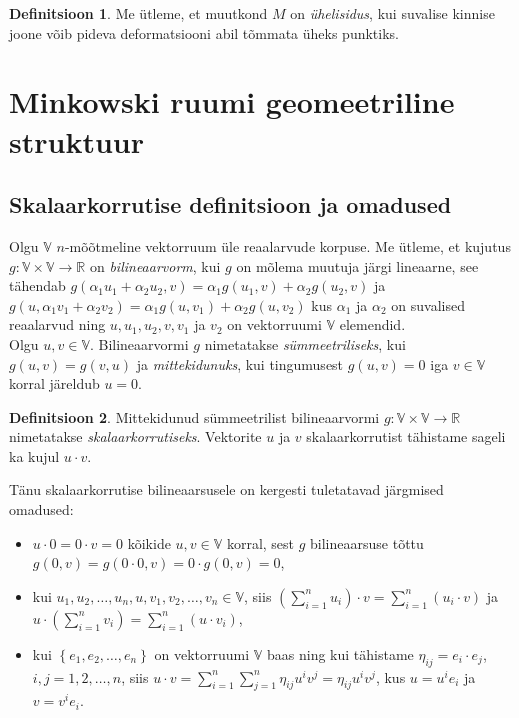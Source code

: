 \documentclass[a4paper,12pt]{article}
\theoremstyle{plain}
\theoremstyle{definition}
\newtheorem{definitsioon}{Definitsioon}[section]
\numberwithin{equation}{section}
\def\R{{\mathbb R}}
\begin{document}
\begin{definitsioon}
Me ütleme, et muutkond $M$ on \emph{ühelisidus}, kui suvalise kinnise joone võib pideva deformatsiooni abil tõmmata üheks punktiks.
\end{definitsioon}

\newpage

\section{Minkowski ruumi geomeetriline struktuur}

\subsection{Skalaarkorrutise definitsioon ja omadused}

Olgu $\mathbb{V}$ $n$-mõõtmeline vektorruum üle reaalarvude korpuse. Me ütleme, et kujutus $g : \mathbb{V} \times \mathbb{V} \rightarrow \R$ on \emph{bilineaarvorm}, kui $g$ on mõlema muutuja järgi lineaarne, see tähendab $g \left( \alpha_1 u_1 + \alpha_2 u_2, v \right) = \alpha_1 g \left( u_1, v \right) + \alpha_2 g \left( u_2, v \right)$ ja $g \left( u, \alpha_1 v_1 + \alpha_2 v_2 \right) = \alpha_1 g \left( u, v_1 \right) + \alpha_2 g \left( u, v_2 \right)$ kus $\alpha_1$ ja $\alpha_2$ on suvalised reaalarvud ning $u, u_1, u_2, v, v_1$ ja $v_2$ on vektorruumi $\mathbb{V}$ elemendid. 
\\
Olgu $u, v \in \mathbb{V}$. Bilineaarvormi $g$ nimetatakse \emph{sümmeetriliseks}, kui $g \left( u, v \right) = g \left(v, u \right)$ ja \emph{mittekidunuks}, kui tingumusest $g \left( u, v \right) = 0$ iga $v \in \mathbb{V}$ korral järeldub  $u = 0$.

\begin{definitsioon}
Mittekidunud sümmeetrilist bilineaarvormi $g: \mathbb{V} \times \mathbb{V} \rightarrow \R$ nimetatakse \emph{skalaarkorrutiseks}. Vektorite $u$ ja $v$ skalaarkorrutist tähistame sageli ka kujul $u \cdot v$.
\end{definitsioon}

Tänu skalaarkorrutise bilineaarsusele on kergesti tuletatavad järgmised omadused:
\begin{itemize}
\item $u \cdot 0 = 0 \cdot v = 0$ kõikide $u, v \in \mathbb{V}$ korral, sest $g$ bilineaarsuse tõttu $g \left(0, v\right) = g \left(0 \cdot 0, v \right) = 0 \cdot g \left(0, v \right) = 0$,
\item kui $u_1, u_2, \dots, u_n, u, v_1, v_2, \dots, v_n \in \mathbb{V}$, siis $\left( \sum_{i = 1}^{n} u_i \right) \cdot v = \sum_{i = 1}^{n}  \left( u_i \cdot v \right)$ ja $u \cdot \left( \sum_{i = 1}^{n} v_i \right) = \sum_{i = 1}^{n}  \left( u \cdot v_i \right)$,
\item kui $\left\lbrace e_1, e_2, \dots, e_n \right\rbrace$ on vektorruumi $\mathbb{V}$ baas ning kui tähistame $\eta_{ij} = e_i \cdot e_j$, $i,j = 1, 2, \dots, n$, siis $u \cdot v = \sum_{i = 1}^{n} \sum_{j = 1}^{n} \eta_{ij} u^i v^j = \eta_{ij} u^i v^j$, kus $u = u^i e_i$ ja $v = v^i e_i$.
\end{itemize}
\end{document}
